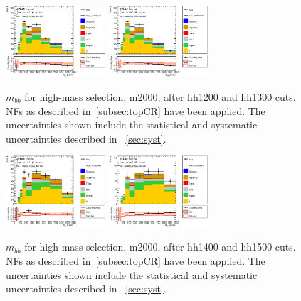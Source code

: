 \begin{figure}[!h]
\begin{center}
\includegraphics*[width=0.33\textwidth] {figures/ControlPlots/reOpt2000_bbMass_allMhh/C_reOpt2000_bbpt350_wwpt250_drww15_hh1200_bbMass_regionA_met25d020}
\includegraphics*[width=0.33\textwidth] {figures/ControlPlots/reOpt2000_bbMass_allMhh/C_reOpt2000_bbpt350_wwpt250_drww15_hh1300_bbMass_regionA_met25d020}
\caption[$m_{bb}$ for low-mass selection, m2000, after hh1200 and hh1300 cuts.]{$m_{bb}$ for high-mass selection, m2000, after hh1200 and hh1300 cuts. \ttbar NFs as described in~\ref{subsec:topCR} have been applied. The uncertainties shown include the statistical and systematic uncertainties described in ~\ref{sec:syst}.}
\end{center}
\end{figure}


\begin{figure}[!h]
\begin{center}
\includegraphics*[width=0.33\textwidth] {figures/ControlPlots/reOpt2000_bbMass_allMhh/C_reOpt2000_bbpt350_wwpt250_drww15_hh1400_bbMass_regionA_met25d020}
\includegraphics*[width=0.33\textwidth] {figures/ControlPlots/reOpt2000_bbMass_allMhh/C_reOpt2000_bbpt350_wwpt250_drww15_hh1500_bbMass_regionA_met25d020}
\caption[$m_{bb}$ for low-mass selection, m2000, after hh1400 and hh1500 cuts.]{$m_{bb}$ for high-mass selection, m2000, after hh1400 and hh1500 cuts. \ttbar NFs as described in~\ref{subsec:topCR} have been applied. The uncertainties shown include the statistical and systematic uncertainties described in ~\ref{sec:syst}.}
\end{center}
\end{figure}


